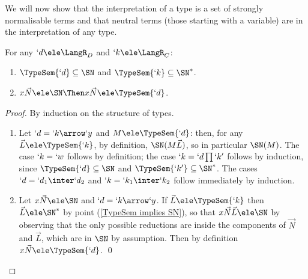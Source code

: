 \documentclass{lmcs}
\newcommand{\vect}[1]{\vec{#1}}
\begin{document}
We will now show that the interpretation of a type is a set of strongly normalisable terms and that neutral terms (those starting with a variable) are in the interpretation of any type.

 \begin{lem} \label{TypeSem and SN lemma}
For any $ `d \ele\LangR_D$ and $`k \ele\LangR_C$:
 \begin{enumerate}

 \item \label{TypeSem implies SN}
$\TypeSem{`d} \subseteq \SN $ and $\TypeSem{`k } \subseteq \SN^* $.

 \item \label{SN head implies TypeSem}
$x\vect{N} \ele \SN \Then x\vect{N} \ele \TypeSem{`d}$.

 \end{enumerate}
 \end {lem}

 \begin{proof}
By induction on the structure of types.

 \begin{enumerate}

 \item %
Let $`d = `k\arrow `y$ and $M \ele \TypeSem{`d}$: 
then, for any $\vect{L} \ele \TypeSem{`k}$, by definition, $\SN(M \vect{L})$, so in particular $\SN(M)$.
%
The case $`k=`w$ follows by definition; the case $`k = `d\prod `k'$ follows by induction, since $\TypeSem{`d} \subseteq \SN$ and $\TypeSem{`k' }\subseteq \SN^*$. 
The cases $`d = `d_1\inter`d_2$ and $`k = `k_1\inter`k_2$ follow immediately by induction.

 \item %
Let $x\vect{N} \ele \SN$ and $`d = `k\arrow `y$. 
If $\vect{L} \ele \TypeSem{`k }$ then $\vect{L} \ele \SN^*$ by point (\ref{TypeSem implies SN}), so that $x\vect{N}\vect{L} \ele \SN$ by observing that the only possible reductions are inside the components of $\vect{N}$ and $\vect{L}$, which are in $\SN$ by assumption.
Then by definition $ x\vect{N} \ele \TypeSem{`d}$.
 \qed

 \end{enumerate}
 \end{proof}
\end{document}
